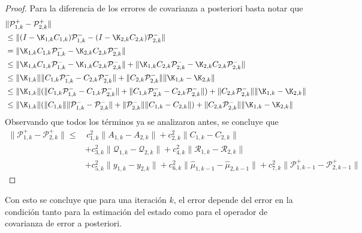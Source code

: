 \begin{proof}
	Para la diferencia de los errores de covarianza a posteriori basta notar que
	\begin{equation*}
		\begin{aligned}
			& \| \mathcal{P}_{1,k}^+ - \mathcal{P}_{2,k}^+  \| \\
			& \leq \| (I - \K_{1,k} C_{1,k}) \mathcal{P}_{1,k}^-  - (I - \K_{2,k} C_{2,k}) \mathcal{P}_{2,k}^- \| \\
			& = \| \K_{1,k} C_{1,k} \mathcal{P}_{1,k}^-  -  \K_{2,k} C_{2,k} \mathcal{P}_{2,k}^- \| \\
			&  \leq \| \K_{1,k} C_{1,k} \mathcal{P}_{1,k}^-  -  \K_{1,k} C_{2,k} \mathcal{P}_{2,k}^- \| +  \| \K_{1,k} C_{2,k} \mathcal{P}_{2,k}^-  -  \K_{2,k} C_{2,k} \mathcal{P}_{2,k}^- \| \\
			& \leq \| \K_{1,k} \| \| C_{1,k} \mathcal{P}_{1,k}^-  -  C_{2,k} \mathcal{P}_{2,k}^- \| + \| C_{2,k} \mathcal{P}_{2,k}^- \|  \| \K_{1,k}   -  \K_{2,k}  \| \\
			& \leq \| \K_{1,k} \| ( \| C_{1,k} \mathcal{P}_{1,k}^-  -  C_{1,k} \mathcal{P}_{2,k}^- \| + \| C_{1,k} \mathcal{P}_{2,k}^-  -  C_{2,k} \mathcal{P}_{2,k}^- \|) + \| C_{2,k} \mathcal{P}_{2,k}^- \|  \| \K_{1,k}   -  \K_{2,k}  \| \\
			& \leq \| \K_{1,k} \| ( \| C_{1,k} \| \| \mathcal{P}_{1,k}^-  -  \mathcal{P}_{2,k}^- \| + \| \mathcal{P}_{2,k}^- \| \| C_{1,k}   -  C_{2,k} \|) + \| C_{2,k} \mathcal{P}_{2,k}^- \|  \| \K_{1,k}   -  \K_{2,k}  \| 
		\end{aligned}
	\end{equation*}
	Observando que todos los términos ya se analizaron antes, se concluye que
	\begin{equation*}
		\begin{aligned}
			\| \mathcal{P}_{1,k}^+ - \mathcal{P}_{2,k}^+  \| \leq & \, c_{1,k}^2 \| A_{1, k} - A_{2, k} \| +  c_{2,k}^2 \| C_{1, k} - C_{2, k} \| \\ 
			&+ c_{3,k}^2 \| \mathcal{Q}_{1, k} - \mathcal{Q}_{2, k} \| + c_{4,k}^2 \| \mathcal{R}_{1, k} - \mathcal{R}_{2, k} \| \\
			&+ c_{5,k}^2 \| y_{1,k} - y_{2,k} \|+ c_{6,k}^2 \| \hat \mu_{1, k-1} - \hat \mu_{2, k-1} \| + c_{7,k}^2 \| \mathcal{P}_{1, k-1}^+ - \mathcal{P}_{2, k-1}^+ \|
		\end{aligned}
	\end{equation*}
\end{proof}
Con esto se concluye que para una iteración $k$, el error depende del error en la condición tanto para la estimación del estado como para el operador de covarianza de error a posteriori.\\
